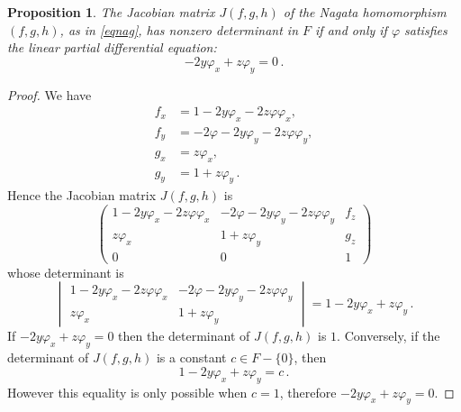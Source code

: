 \documentclass{amsart}
\newtheorem{prop}{Proposition}
\begin{document}
\begin{prop}\label{detedp}
	The Jacobian matrix  $J(f,g,h)$ of the Nagata homomorphism $(f,g,h)$, as in \eqref{eqnag}, has nonzero determinant in $F$ if and only if $\varphi$ satisfies the linear partial differential equation:
	$$-2y\varphi_x+z\varphi_y=0\,.$$
\end{prop}
\begin{proof}
	We have
	\begin{align*}
		f_x&=1-2y\varphi_x-2z\varphi\varphi_x,\\
		f_y&=-2\varphi-2y\varphi_y-2z\varphi\varphi_y,\\
		g_x&=z\varphi_x,\\
		g_y&=1+z\varphi_y\,.
	\end{align*}
	Hence the Jacobian matrix $J(f,g,h)$ is 
	\[\begin{pmatrix}
		1-2y\varphi_x-2z\varphi\varphi_x&-2\varphi-2y\varphi_y-2z\varphi\varphi_y&f_z\\
		z\varphi_x&1+z\varphi_y&g_z\\
		0&0&1
	\end{pmatrix}
	\]
	whose determinant is 
	\[\begin{vmatrix}
		1-2y\varphi_x-2z\varphi\varphi_x&-2\varphi-2y\varphi_y-2z\varphi\varphi_y\\
		z\varphi_x&1+z\varphi_y
	\end{vmatrix}=1-2y\varphi_x+z\varphi_y\,.\]
	If $-2y\varphi_x+z\varphi_y=0$ then the determinant of $J(f,g,h)$ is $1$. Conversely, if the determinant of $J(f,g,h)$ is a constant $c\in F-\{0\}$, then 
	$$1-2y\varphi_x+z\varphi_y=c\,.$$
	However this equality is only possible when $c=1$, therefore $-2y\varphi_x+z\varphi_y=0$.
\end{proof}
\end{document}
